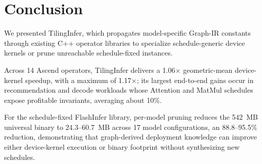 \section{Conclusion}
\label{sec:concl}

{\color{red}%
\par}

{\color{blue}%
We presented TilingInfer, which propagates model-specific Graph-IR constants through existing C++ operator libraries to specialize schedule-generic device kernels or prune unreachable schedule-fixed instances.
\par}

{\color{blue}%
Across 14 Ascend operators, TilingInfer delivers a 1.06$\times$ geometric-mean device-kernel speedup, with a maximum of 1.17$\times$; its largest end-to-end gains occur in recommendation and decode workloads whose Attention and MatMul schedules expose profitable invariants, averaging about 10\%.
\par}

{\color{blue}%
For the schedule-fixed FlashInfer library, per-model pruning reduces the 542~MB universal binary to 24.3--60.7~MB across 17 model configurations, an 88.8--95.5\% reduction, demonstrating that graph-derived deployment knowledge can improve either device-kernel execution or binary footprint without synthesizing new schedules.
\par}
